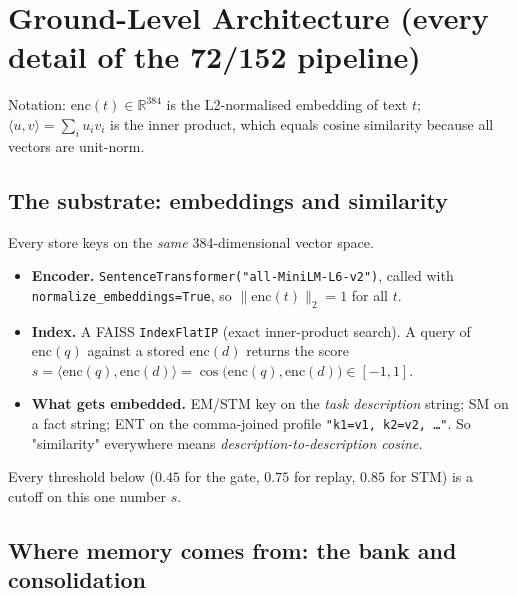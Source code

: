 \section{Ground-Level Architecture (every detail of the 72/152 pipeline)}
\label{sec:groundlevel}

Notation: $\mathrm{enc}(t)\in\mathbb{R}^{384}$ is the L2-normalised embedding of text $t$;
$\langle u,v\rangle=\sum_i u_i v_i$ is the inner product, which equals cosine similarity because
all vectors are unit-norm.

\subsection{The substrate: embeddings and similarity}
\label{sec:gl-embed}
Every store keys on the \emph{same} 384-dimensional vector space.
\begin{itemize}\itemsep1pt
\item \textbf{Encoder.} \texttt{SentenceTransformer("all-MiniLM-L6-v2")}, called with
\texttt{normalize\_embeddings=True}, so $\lVert \mathrm{enc}(t)\rVert_2 = 1$ for all $t$.
\item \textbf{Index.} A FAISS \texttt{IndexFlatIP} (exact inner-product search). A query of
$\mathrm{enc}(q)$ against a stored $\mathrm{enc}(d)$ returns the score
$s = \langle \mathrm{enc}(q),\mathrm{enc}(d)\rangle = \cos\!\big(\mathrm{enc}(q),\mathrm{enc}(d)\big)\in[-1,1]$.
\item \textbf{What gets embedded.} EM/STM key on the \emph{task description} string; SM on a fact
string; ENT on the comma-joined profile \texttt{"k1=v1, k2=v2, \dots"}. So "similarity" everywhere
means \emph{description-to-description cosine}.
\end{itemize}
Every threshold below ($0.45$ for the gate, $0.75$ for replay, $0.85$ for STM) is a cutoff on this
one number $s$.

\subsection{Where memory comes from: the bank and consolidation}
\label{sec:gl-bank}
